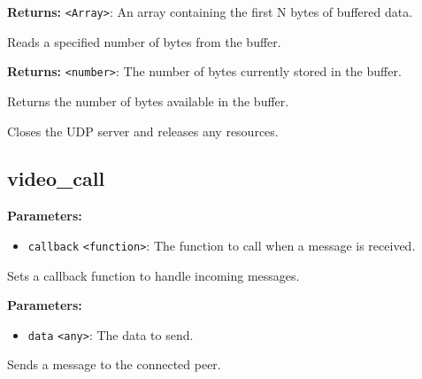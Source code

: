 \documentclass[12pt,a4paper]{article}
\begin{document}
\noindent \textbf{Returns:} \texttt{<Array>}: An array containing the first N bytes of buffered data.

\noindent Reads a specified number of bytes from the buffer.

\vspace{5mm}
\noindent {}


\noindent \textbf{Returns:} \texttt{<number>}: The number of bytes currently stored in the buffer.

\noindent Returns the number of bytes available in the buffer.

\vspace{5mm}
\noindent {}


\noindent Closes the UDP server and releases any resources.


\subsection{video\_call}
\vspace{5mm}
\noindent {}


\noindent \textbf{Parameters:}
\begin{itemize}
  \item \texttt{callback} \texttt{<function>}: The function to call when a message is received.
\end{itemize}

\noindent Sets a callback function to handle incoming messages.

\vspace{5mm}
\noindent {}


\noindent \textbf{Parameters:}
\begin{itemize}
  \item \texttt{data} \texttt{<any>}: The data to send.
\end{itemize}

\noindent Sends a message to the connected peer.
\end{document}
